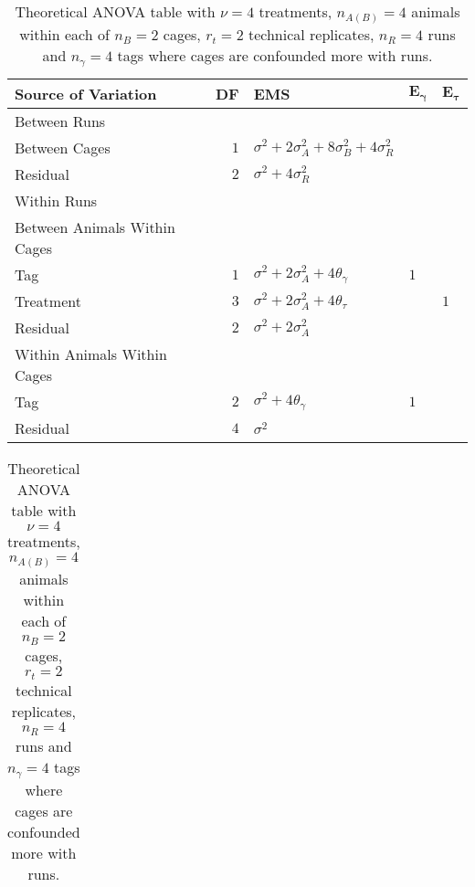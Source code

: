 \begin{table}[ht]
	\centering
	\caption{Theoretical ANOVA table with $\nu = 4$ treatments, $n_{A(B)} = 4$ animals within each of $n_B = 2$ cages, $r_t = 2$ technical replicates, $n_R = 4$ runs and $n_\gamma = 4$ tags where cages are confounded more with runs.}
	\begin{tabular}[t]{lrlll}
		\toprule
		\multicolumn{1}{l}{\textbf{Source of Variation}} & \multicolumn{1}{l}{\textbf{DF}} & \multicolumn{1}{l}{\textbf{EMS}}& \multicolumn{1}{l}{$\bm{E_{\gamma}}$}&\multicolumn{1}{l}{$\bm{E_{\tau}}$}\\
		\midrule
		Between Runs &  &  & & \\ 
		\quad Between Cages & $1$ & $\sigma^2+2\sigma_{A}^2+8\sigma_{B}^2+4\sigma_{R}^2$ & & \\
		\quad Residual & $2$ & $\sigma^2+4\sigma_{R}^2$ & & \\ \hline
		Within Runs &  &  & & \\ 
		\quad Between Animals Within Cages &  &  & & \\
		\quad \quad Tag & $1$ & $\sigma^2+2\sigma_{A}^2+4\theta_{\gamma}$ &$1$ & \\
		\quad \quad Treatment & $3$ & $\sigma^2+2\sigma_{A}^2+4\theta_{\tau}$ & & $1$\\
		\quad \quad Residual & $2$ & $\sigma^2+2\sigma_{A}^2$ & & \\ \hline
		\quad Within Animals Within Cages &  &  & & \\
		\quad \quad Tag & $2$ & $\sigma^2+4\theta_{\gamma}$ &$1$ & \\
		\quad \quad Residual & $4$ & $\sigma^2$ & & \\
		\bottomrule
	\end{tabular}
	\label{tab:Phase2ANOVA13}
	
	\begin{tabular}{l}
		\\	
	\end{tabular} 
	

\end{table}
